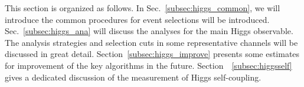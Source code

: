 This section is organized as follows. In
Sec.~\ref{subsec:higgs_common},  we will introduce  the common
procedures for event selections will be
introduced. Sec.~\ref{subsec:higgs_ana} will discuss the 
analyses for the main Higgs observable. The analysis strategies and 
selection cuts in some representative channels will be  discussed in great detail. 
Section~\ref{subsec:higgs_improve}  presents some estimates for
improvement of the key algorithms in the future.
Section~~\ref{subsec:higgsself}  gives a dedicated discussion of the 
 measurement of Higgs self-coupling.
